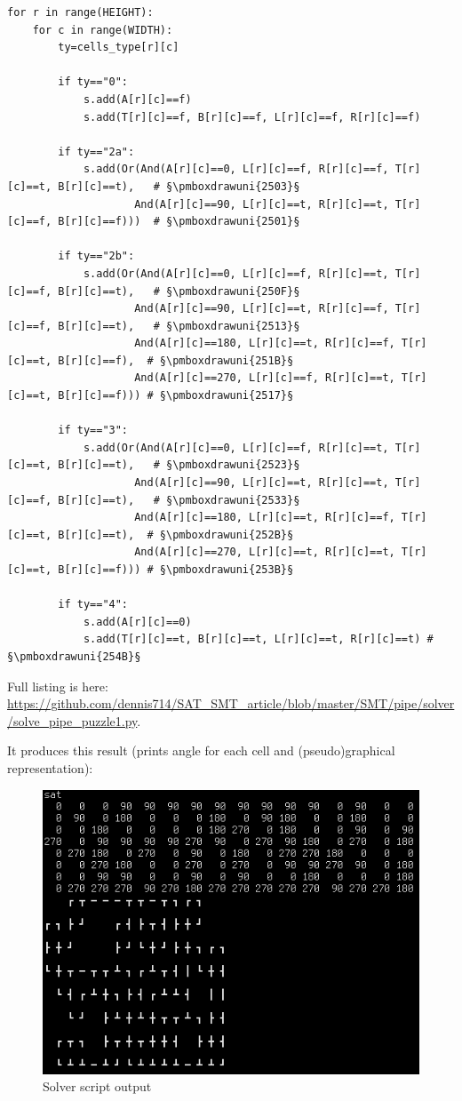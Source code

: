\begin{lstlisting}
for r in range(HEIGHT):
    for c in range(WIDTH):
        ty=cells_type[r][c]

        if ty=="0":
            s.add(A[r][c]==f)
            s.add(T[r][c]==f, B[r][c]==f, L[r][c]==f, R[r][c]==f)

        if ty=="2a":
            s.add(Or(And(A[r][c]==0, L[r][c]==f, R[r][c]==f, T[r][c]==t, B[r][c]==t),   # §\pmboxdrawuni{2503}§
                    And(A[r][c]==90, L[r][c]==t, R[r][c]==t, T[r][c]==f, B[r][c]==f)))  # §\pmboxdrawuni{2501}§

        if ty=="2b":
            s.add(Or(And(A[r][c]==0, L[r][c]==f, R[r][c]==t, T[r][c]==f, B[r][c]==t),   # §\pmboxdrawuni{250F}§
                    And(A[r][c]==90, L[r][c]==t, R[r][c]==f, T[r][c]==f, B[r][c]==t),   # §\pmboxdrawuni{2513}§
                    And(A[r][c]==180, L[r][c]==t, R[r][c]==f, T[r][c]==t, B[r][c]==f),  # §\pmboxdrawuni{251B}§
                    And(A[r][c]==270, L[r][c]==f, R[r][c]==t, T[r][c]==t, B[r][c]==f))) # §\pmboxdrawuni{2517}§
	
        if ty=="3":
            s.add(Or(And(A[r][c]==0, L[r][c]==f, R[r][c]==t, T[r][c]==t, B[r][c]==t),   # §\pmboxdrawuni{2523}§
                    And(A[r][c]==90, L[r][c]==t, R[r][c]==t, T[r][c]==f, B[r][c]==t),   # §\pmboxdrawuni{2533}§
                    And(A[r][c]==180, L[r][c]==t, R[r][c]==f, T[r][c]==t, B[r][c]==t),  # §\pmboxdrawuni{252B}§
                    And(A[r][c]==270, L[r][c]==t, R[r][c]==t, T[r][c]==t, B[r][c]==f))) # §\pmboxdrawuni{253B}§

        if ty=="4":
            s.add(A[r][c]==0)
            s.add(T[r][c]==t, B[r][c]==t, L[r][c]==t, R[r][c]==t) # §\pmboxdrawuni{254B}§
\end{lstlisting}

Full listing is here: \url{https://github.com/dennis714/SAT_SMT_article/blob/master/SMT/pipe/solver/solve_pipe_puzzle1.py}.

It produces this result (prints angle for each cell and (pseudo)graphical representation):

\begin{figure}[H]
\centering
\includegraphics[scale=0.75]{SMT/pipe/solver/solver.png}
\caption{Solver script output}
\end{figure}

